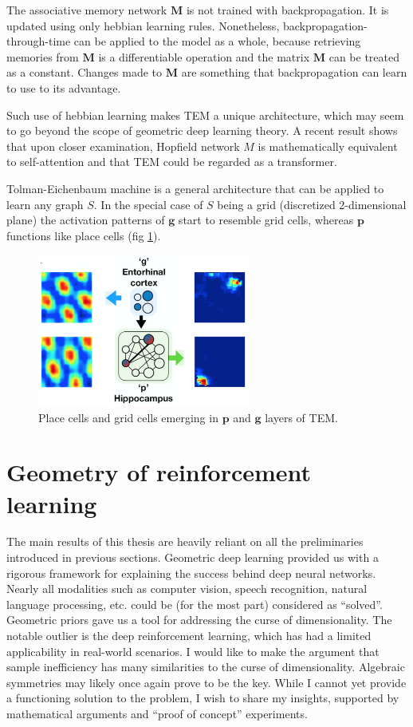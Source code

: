 \documentclass[12pt]{article}
\begin{document}
The associative memory network $\boldsymbol{M}$ is not trained with backpropagation. It is updated using only hebbian learning rules. Nonetheless, backpropagation-through-time can be applied to the model as a whole, because  retrieving memories from $\boldsymbol{M}$ is a differentiable operation and the matrix $\boldsymbol{M}$ can be treated as a constant. Changes made to $\boldsymbol{M}$ are something that backpropagation can learn to use to its advantage. 

Such use of hebbian learning makes TEM a unique architecture, which may seem to go beyond the scope of geometric deep learning theory. A recent result \cite{TEM_as_teransformer} shows that upon closer examination, Hopfield network $M$ is mathematically equivalent to self-attention and that TEM could be regarded as a transformer. 

Tolman-Eichenbaum machine is a general architecture that can be applied to learn any graph $S$. In the special case of $S$ being a grid (discretized 2-dimensional plane) the activation patterns of $\boldsymbol{g}$ start to resemble grid cells, whereas $\boldsymbol{p}$ functions like place cells (fig \ref{fig:tolman_eich_results}).
\begin{figure}[!htbp]
	\centering
	\includegraphics[width=7cm]{tolman_eich_results}
	\caption{Place cells and grid cells emerging in $\boldsymbol{p}$ and $\boldsymbol{g}$ layers of TEM.}
	\label{fig:tolman_eich_results}
\end{figure} 

\section{Geometry of reinforcement learning}

The main results of this thesis are heavily reliant on all the preliminaries introduced in previous sections. Geometric deep learning provided us with a rigorous framework for explaining the success behind deep neural networks. Nearly all modalities such as computer vision, speech recognition, natural language processing, etc. could be (for the most part) considered as ``solved''. Geometric priors gave us a tool for addressing the curse of dimensionality.
The notable outlier is the deep reinforcement learning, which has had a limited applicability in real-world scenarios. I would like to make the argument that sample inefficiency has many similarities to the curse of dimensionality. Algebraic symmetries may likely once again prove to be the key. While I cannot yet provide a functioning solution to the problem, I wish to share my insights, supported by mathematical arguments and ``proof of concept'' experiments. 
\end{document}

